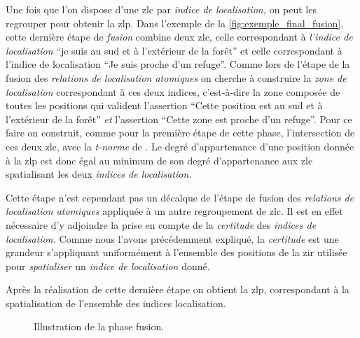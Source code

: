 Une fois que l'on dispose d'une \ac{zlc} par \emph{indice de
  localisation,} on peut les regrouper pour obtenir la \ac{zlp}. Dans
l'exemple de la \autoref{fig:exemple_final_fusion}, cette dernière
étape de \emph{fusion} combine deux \ac{zlc}, celle correspondant à
\emph{l'indice de localisation} \enquote{je suis au sud et à
  l'extérieur de la forêt} et celle correspondant à l'indice de
localisation \enquote{Je suis proche d'un refuge}. Comme lors de
l'étape de la fusion des \emph{relations de localisation atomiques} on
cherche à construire la \emph{zone de localisation} correspondant à
ces deux indices, c'est-à-dire la zone composée de toutes les
positions qui valident l'assertion \enquote{Cette position est au sud
  et à l'extérieur de la forêt} \emph{et} l'assertion \enquote{Cette
  zone est proche d'un refuge}. Pour ce faire on construit, comme pour
la première étape de cette phase, l'intersection de ces deux \ac{zlc},
avec la \emph{t-norme} de \textcite{Zadeh1965}. Le degré
d’appartenance d'une position donnée à la \ac{zlp} est donc égal au
minimum de son degré d'appartenance aux \ac{zlc} spatialisant les deux
\emph{indices de localisation.}

Cette étape n'est cependant pas un décalque de l'étape de fusion des
\emph{relations de localisation atomiques} appliquée à un autre
regroupement de \ac{zlc}. Il est en effet nécessaire d'y adjoindre la
prise en compte de la \emph{certitude} des \emph{indices de
  localisation.} Comme nous l'avons précédemment expliqué, la
\emph{certitude} est une grandeur s'appliquant uniformément à
l'ensemble des positions de la \ac{zir} utilisée pour
\emph{spatialiser} un \emph{indice de localisation} donné.

Après la réalisation de cette dernière étape on obtient la \ac{zlp},
correspondant à la spatialisation de l'ensemble des indices
localisation.

\begin{landscape}
  \begin{figure}[!h]
    \centering
    
    \caption{Illustration de la phase fusion.}
    \label{fig:exemple_final_fusion}
  \end{figure}
\end{landscape}


